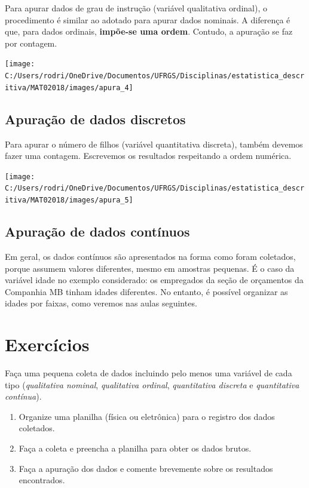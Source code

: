 \documentclass[nofonts,]{tufte-handout}
\providecommand{\tightlist}{%
  \setlength{\itemsep}{0pt}\setlength{\parskip}{0pt}}
\begin{document}
Para apurar dados de grau de instrução (variável qualitativa ordinal), o
procedimento é similar ao adotado para apurar dados nominais. A
diferença é que, para dados ordinais, \textbf{impõe-se uma ordem}.
Contudo, a apuração se faz por contagem.

\texttt{[image: C:/Users/rodri/OneDrive/Documentos/UFRGS/Disciplinas/estatistica\_descritiva/MAT02018/images/apura\_4]}

\hypertarget{apurauxe7uxe3o-de-dados-discretos}{%
\subsection{Apuração de dados
discretos}\label{apurauxe7uxe3o-de-dados-discretos}}

Para apurar o número de filhos (variável quantitativa discreta), também
devemos fazer uma contagem. Escrevemos os resultados respeitando a ordem
numérica.

\texttt{[image: C:/Users/rodri/OneDrive/Documentos/UFRGS/Disciplinas/estatistica\_descritiva/MAT02018/images/apura\_5]}

\hypertarget{apurauxe7uxe3o-de-dados-contuxednuos}{%
\subsection{Apuração de dados
contínuos}\label{apurauxe7uxe3o-de-dados-contuxednuos}}

Em geral, os dados contínuos são apresentados na forma como foram
coletados, porque assumem valores diferentes, mesmo em amostras
pequenas. É o caso da variável idade no exemplo considerado: os
empregados da seção de orçamentos da Companhia MB tinham idades
diferentes. No entanto, é possível organizar as idades por faixas, como
veremos nas aulas seguintes.

\hypertarget{exercuxedcios}{%
\section{Exercícios}\label{exercuxedcios}}

Faça uma pequena coleta de dados incluindo pelo menos uma variável de
cada tipo (\emph{qualitativa nominal}, \emph{qualitativa ordinal},
\emph{quantitativa discreta} e \emph{quantitativa contínua}).

\begin{enumerate}
\def\labelenumi{\arabic{enumi}.}
\tightlist
\item
  Organize uma planilha (física ou eletrônica) para o registro dos dados
  coletados.
\item
  Faça a coleta e preencha a planilha para obter os dados brutos.
\item
  Faça a apuração dos dados e comente brevemente sobre os resultados
  encontrados.
\end{enumerate}
\end{document}
